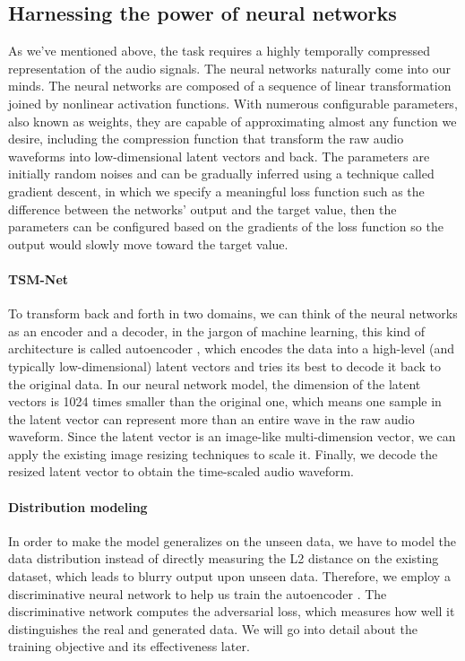 \documentclass[12pt]{article}
\begin{document}
\subsection{Harnessing the power of neural networks}
As we've mentioned above, the task requires a highly temporally compressed representation of the audio signals. The neural networks naturally come into our minds. The neural networks are composed of a sequence of linear transformation joined by nonlinear activation functions. With numerous configurable parameters, also known as weights, they are capable of approximating almost any function we desire, including the compression function that transform the raw audio waveforms into low-dimensional latent vectors and back. The parameters are initially random noises and can be gradually inferred using a technique called gradient descent, in which we specify a meaningful loss function such as the difference between the networks' output and the target value, then the parameters can be configured based on the gradients of the loss function so the output would slowly move toward the target value.

\paragraph{TSM-Net}
To transform back and forth in two domains, we can think of the neural networks as an encoder and a decoder, in the jargon of machine learning, this kind of architecture is called autoencoder \cite{kra91}, which encodes the data into a high-level (and typically low-dimensional) latent vectors and tries its best to decode it back to the original data. In our neural network model, the dimension of the latent vectors is 1024 times smaller than the original one, which means one sample in the latent vector can represent more than an entire wave in the raw audio waveform. Since the latent vector is an image-like multi-dimension vector, we can apply the existing image resizing techniques to scale it. Finally, we decode the resized latent vector to obtain the time-scaled audio waveform.

\paragraph{Distribution modeling}
In order to make the model generalizes on the unseen data, we have to model the data distribution instead of directly measuring the L2 distance on the existing dataset, which leads to blurry output upon unseen data. Therefore, we employ a discriminative neural network to help us train the autoencoder \cite{goo14}. The discriminative network computes the adversarial loss, which measures how well it distinguishes the real and generated data. We will go into detail about the training objective and its effectiveness later.
\end{document}
